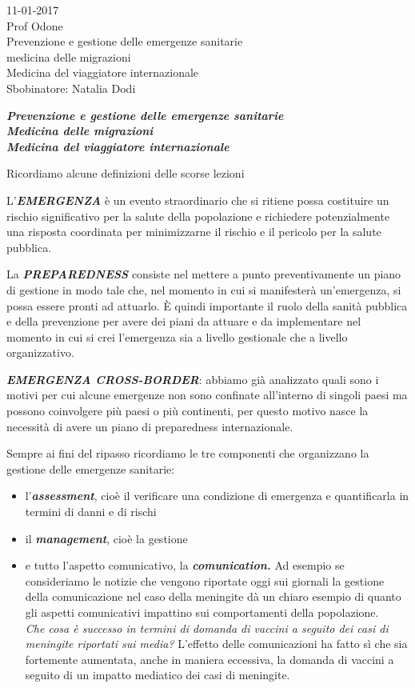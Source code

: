 \documentclass[]{article}
\date{}
\begin{document}
11-01-2017\\
Prof Odone\\
Prevenzione e gestione delle emergenze sanitarie\\
medicina delle migrazioni\\
Medicina del viaggiatore internazionale\\
Sbobinatore: Natalia Dodi

\emph{\textbf{Prevenzione e gestione delle emergenze sanitarie\\
Medicina delle migrazioni\\
Medicina del viaggiatore internazionale}}

Ricordiamo alcune definizioni delle scorse lezioni

L'\textbf{\emph{EMERGENZA}} è un evento straordinario che si ritiene
possa costituire un rischio significativo per la salute della
popolazione e richiedere potenzialmente una risposta coordinata per
minimizzarne il rischio e il pericolo per la salute pubblica.

La \textbf{\emph{PREPAREDNESS}} consiste nel mettere a punto
preventivamente un piano di gestione in modo tale che, nel momento in
cui si manifesterà un'emergenza, si possa essere pronti ad attuarlo. È
quindi importante il ruolo della sanità pubblica e della prevenzione per
avere dei piani da attuare e da implementare nel momento in cui si crei
l'emergenza sia a livello gestionale che a livello organizzativo.

\textbf{\emph{EMERGENZA CROSS-BORDER}}: abbiamo già analizzato quali
sono i motivi per cui alcune emergenze non sono confinate all'interno di
singoli paesi ma possono coinvolgere più paesi o più continenti, per
questo motivo nasce la necessità di avere un piano di preparedness
internazionale.

Sempre ai fini del ripasso ricordiamo le tre componenti che organizzano
la gestione delle emergenze sanitarie:

\begin{itemize}
\item
  l'\textbf{\emph{assessment}}, cioè il verificare una condizione di
  emergenza e quantificarla in termini di danni e di rischi
\end{itemize}

\begin{itemize}
\item
  il \textbf{\emph{management}}, cioè la gestione
\item
  e tutto l'aspetto comunicativo, la \textbf{\emph{comunication.}} Ad
  esempio se consideriamo le notizie che vengono riportate oggi sui
  giornali la gestione della comunicazione nel caso della meningite dà
  un chiaro esempio di quanto gli aspetti comunicativi impattino sui
  comportamenti della popolazione.\\
  \emph{Che cosa è successo in termini di domanda di vaccini a seguito
  dei casi di meningite riportati sui media?} L'effetto delle
  comunicazioni ha fatto sì che sia fortemente aumentata, anche in
  maniera eccessiva, la domanda di vaccini a seguito di un impatto
  mediatico dei casi di meningite.
\end{itemize}
\end{document}
